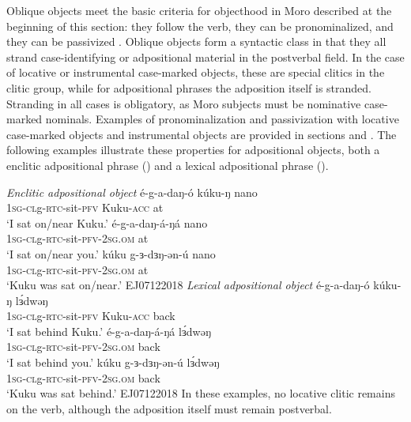 Oblique objects meet the basic criteria for objecthood in Moro described at the beginning of this section: they follow the verb, they can be pronominalized, and they can be passivized \citep{Ackerman:2015}. Oblique objects form a syntactic class in that they all strand case-identifying or adpositional material in the postverbal field. In the case of locative or instrumental case-marked objects, these are special clitics in the clitic group, while for adpositional phrases the adposition itself is stranded. Stranding in all cases is obligatory, as Moro subjects must be nominative case-marked nominals. Examples of pronominalization and passivization with locative case-marked objects and instrumental objects are provided in sections  and . The following examples illustrate these properties for adpositional objects, both a enclitic adpositional phrase () and a lexical adpositional phrase ().

\ea \textit{Enclitic adpositional object}
\ea \gll é-g-a-daŋ-ó kúku-ŋ nano\\
		\textsc{1sg-cl}g-\textsc{rtc}-sit-\textsc{pfv} Kuku-\textsc{acc} at \\
	\glt `I sat on/near Kuku.'  
\ex \gll é-g-a-daŋ-á-ŋá nano\\
		\textsc{1sg-cl}g-\textsc{rtc}-sit-\textsc{pfv}-\textsc{2sg.om} at \\
	\glt `I sat on/near you.'
\ex \gll kúku g-ɜ-dɜŋ-ən-ú nano\\
		\textsc{1sg-cl}g-\textsc{rtc}-sit-\textsc{pfv}-\textsc{2sg.om} at \\
	\glt `Kuku was sat on/near.' \hfill EJ07122018
	\z 
\ex	\textit{Lexical adpositional object}
\ea \gll é-g-a-daŋ-ó kúku-ŋ lɜ́dwəŋ\\
		\textsc{1sg-cl}g-\textsc{rtc}-sit-\textsc{pfv} Kuku-\textsc{acc} back \\
	\glt `I sat behind Kuku.'  
\ex \gll é-g-a-daŋ-á-ŋá lɜ́dwəŋ\\
		\textsc{1sg-cl}g-\textsc{rtc}-sit-\textsc{pfv}-\textsc{2sg.om} back \\
	\glt `I sat behind you.'
\ex \gll kúku g-ɜ-dɜŋ-ən-ú lɜ́dwəŋ\\
		\textsc{1sg-cl}g-\textsc{rtc}-sit-\textsc{pfv}-\textsc{2sg.om} back \\
	\glt `Kuku was sat behind.' \hfill EJ07122018
	\z 
\z
In these examples, no locative clitic remains on the verb, although the adposition itself must remain postverbal.

